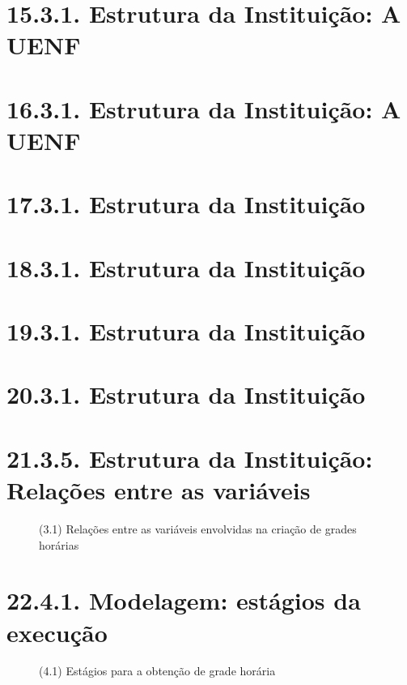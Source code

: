 \cite{Piechowiak2004}

\cite{arratia-martinez_university_2021, miranda_udpskeduler_2012, Piechowiak2004, Burke2000}

\cite{Burke2000}

\cite{arratia-martinez_university_2021}
\chapter{15.3.1. Estrutura da Instituição: A UENF}
\cite{Estatuto2002, PDI2023, RegimentoGeralUENF2006, RegimentoGeralGraduação2012, RegimentoCâmaraGraduação2012, Normas2012, PPCCC2005, PPCCC2015, PPCCC2022, Matriz2015}
\chapter*{16.3.1. Estrutura da Instituição: A UENF}
\chapter*{17.3.1. Estrutura da Instituição}
\chapter*{18.3.1. Estrutura da Instituição}
\chapter*{19.3.1. Estrutura da Instituição}
\chapter*{20.3.1. Estrutura da Instituição}
\chapter*{21.3.5. Estrutura da Instituição: Relações entre as variáveis}
\begin{figure}[htpb]\caption{(3.1) Relações entre as variáveis envolvidas na criação de grades horárias}\end{figure}
\chapter{22.4.1. Modelagem: estágios da execução}
\begin{figure}[htpb]\caption{(4.1) Estágios para a obtenção de grade horária} \end{figure}
